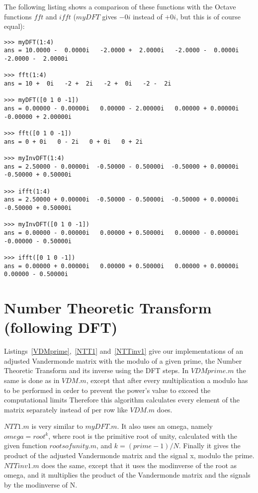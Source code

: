 \documentclass{article}
\begin{document}
The following listing shows a comparison of these functions with the Octave functions $fft$ and $ifft$ ($myDFT$ gives $-0i$ instead of $+0i$, but this is of course equal):

\begin{lstlisting}
>>> myDFT(1:4)
ans = 10.0000 -  0.0000i   -2.0000 +  2.0000i   -2.0000 -  0.0000i   -2.0000 -  2.0000i

>>> fft(1:4)
ans = 10 +  0i   -2 +  2i   -2 +  0i   -2 -  2i

>>> myDFT([0 1 0 -1])
ans = 0.00000 - 0.00000i   0.00000 - 2.00000i   0.00000 + 0.00000i   -0.00000 + 2.00000i

>>> fft([0 1 0 -1])
ans = 0 + 0i   0 - 2i   0 + 0i   0 + 2i

>>> myInvDFT(1:4)
ans = 2.50000 - 0.00000i  -0.50000 - 0.50000i  -0.50000 + 0.00000i   -0.50000 + 0.50000i

>>> ifft(1:4)
ans = 2.50000 + 0.00000i  -0.50000 - 0.50000i  -0.50000 + 0.00000i   -0.50000 + 0.50000i

>>> myInvDFT([0 1 0 -1])
ans = 0.00000 - 0.00000i   0.00000 + 0.50000i   0.00000 - 0.00000i   -0.00000 - 0.50000i

>>> ifft([0 1 0 -1])
ans = 0.00000 + 0.00000i   0.00000 + 0.50000i   0.00000 + 0.00000i    0.00000 - 0.50000i
\end{lstlisting}

 
 
 

\section{Number Theoretic Transform (following DFT)}
Listings~\ref{VDMprime},~\ref{NTT1} and~\ref{NTTinv1} give our implementations of
an adjusted Vandermonde matrix with the modulo of a given prime,
the Number Theoretic Transform and its inverse using the DFT steps.
In $VDMprime.m$ the same is done as in $VDM.m$,
except that after every multiplication a modulo has to be performed
in order to prevent the power's value to exceed the computational limits
Therefore this algorithm calculates every element of the matrix separately instead of per row like $VDM.m$ does.

$NTT1.m$ is very similar to $myDFT.m$.
 It also uses an omega, namely $omega = root^k$,
 where root is the primitive root of unity,
 calculated with the given function $rootsofunity.m$, and $k = (prime - 1)/N$.
 Finally it gives the product of the adjusted Vandermonde matrix and the signal x, modulo the prime.
 $NTTinv1.m$ does the same, except that it uses the modinverse of the root as omega,
and it multiplies the product of the Vandermonde matrix and the signals by the modinverse of N.
\end{document}
